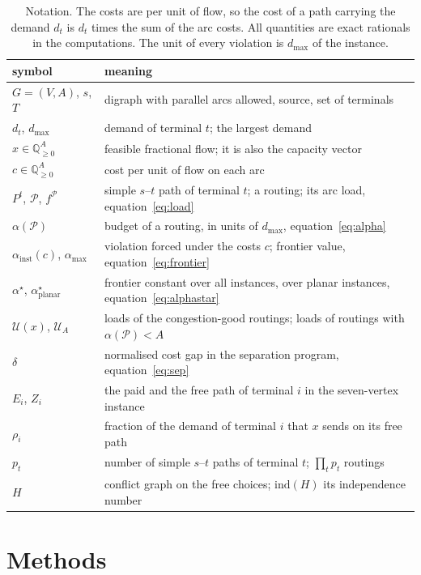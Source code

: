 \documentclass[11pt]{article}
\theoremstyle{remark}
\newcommand{\dmax}{d_{\max}}
\newcommand{\flow}{f}
\newcommand{\Q}{\mathbb{Q}}
\begin{document}
\begin{table}[t]
\centering\small
\begin{tabular}{@{}l>{\raggedright\arraybackslash}p{10.2cm}@{}}
\toprule
symbol & meaning\\
\midrule
$G=(V,A)$, $s$, $T$ & digraph with parallel arcs allowed, source, set of terminals\\
$d_t$, $\dmax$ & demand of terminal $t$; the largest demand\\
$x\in\Q^A_{\ge0}$ & feasible fractional flow; it is also the capacity vector\\
$c\in\Q^A_{\ge0}$ & cost per unit of flow on each arc\\
$P^t$, $\mathcal P$, $\flow^{\mathcal P}$ & simple $s$--$t$ path of terminal $t$; a routing; its arc load, equation~\eqref{eq:load}\\
$\alpha(\mathcal P)$ & budget of a routing, in units of $\dmax$, equation~\eqref{eq:alpha}\\
$\alpha_{\mathrm{inst}}(c)$, $\alpha_{\max}$ & violation forced under the costs $c$; frontier value, equation~\eqref{eq:frontier}\\
$\alpha^\star$, $\alpha^\star_{\mathrm{planar}}$ & frontier constant over all instances, over planar instances, equation~\eqref{eq:alphastar}\\
$\mathcal U(x)$, $\mathcal U_A$ & loads of the congestion-good routings; loads of routings with $\alpha(\mathcal P)<A$\\
$\delta$ & normalised cost gap in the separation program, equation~\eqref{eq:sep}\\
$E_i$, $Z_i$ & the paid and the free path of terminal $i$ in the seven-vertex instance\\
$\rho_i$ & fraction of the demand of terminal $i$ that $x$ sends on its free path\\
$p_t$ & number of simple $s$--$t$ paths of terminal $t$; $\prod_tp_t$ routings\\
$H$ & conflict graph on the free choices; $\mathrm{ind}(H)$ its independence number\\
\bottomrule
\end{tabular}
\caption{Notation. The costs are per unit of flow, so the cost of a path carrying the demand $d_t$ is $d_t$ times the sum of the arc
costs. All quantities are exact rationals in the computations. The unit of every violation is $\dmax$ of the instance.}
\label{tab:notation}
\end{table}

\section{Methods}
\label{sec:methods}
\end{document}
